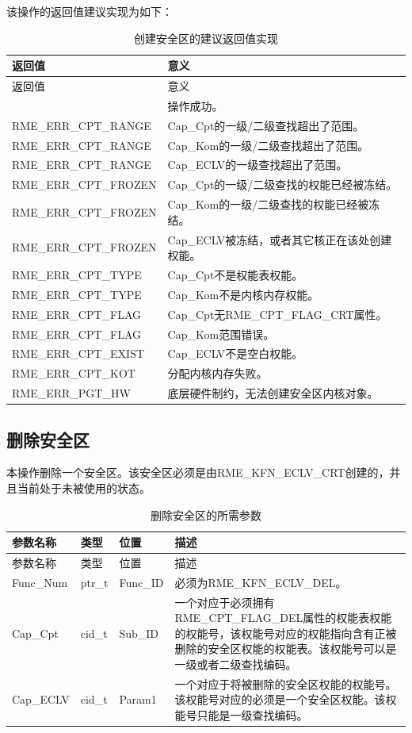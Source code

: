 该操作的返回值建议实现为如下：

\begin{xltabular}{\textwidth}{@{}>{\hsize\raggedright\arraybackslash}X>{\hsize\raggedright\arraybackslash}X@{}}
\caption{创建安全区的建议返回值实现}\label{tab:8-95-create-enclave-suggested-return-values}\\
\toprule
返回值 & 意义\tabularnewline
\endfirsthead
\toprule
返回值 & 意义\tabularnewline
\midrule
\endhead
\bottomrule
{} & 操作成功。\tabularnewline
    RME\_ERR\_CPT\_RANGE & Cap\_Cpt的一级/二级查找超出了范围。\tabularnewline
    RME\_ERR\_CPT\_RANGE & Cap\_Kom的一级/二级查找超出了范围。\tabularnewline
    RME\_ERR\_CPT\_RANGE & Cap\_ECLV的一级查找超出了范围。\tabularnewline
    RME\_ERR\_CPT\_FROZEN & Cap\_Cpt的一级/二级查找的权能已经被冻结。\tabularnewline
    RME\_ERR\_CPT\_FROZEN & Cap\_Kom的一级/二级查找的权能已经被冻结。\tabularnewline
    RME\_ERR\_CPT\_FROZEN & Cap\_ECLV被冻结，或者其它核正在该处创建权能。\tabularnewline
    RME\_ERR\_CPT\_TYPE & Cap\_Cpt不是权能表权能。\tabularnewline
    RME\_ERR\_CPT\_TYPE & Cap\_Kom不是内核内存权能。\tabularnewline
    RME\_ERR\_CPT\_FLAG & Cap\_Cpt无RME\_CPT\_FLAG\_CRT属性。\tabularnewline
    RME\_ERR\_CPT\_FLAG & Cap\_Kom范围错误。\tabularnewline
    RME\_ERR\_CPT\_EXIST & Cap\_ECLV不是空白权能。\tabularnewline
    RME\_ERR\_CPT\_KOT & 分配内核内存失败。\tabularnewline
    RME\_ERR\_PGT\_HW & 底层硬件制约，无法创建安全区内核对象。\tabularnewline
\end{xltabular}

\subsection{删除安全区}\label{subsec:8-delete-enclave}

本操作删除一个安全区。该安全区必须是由RME\_KFN\_ECLV\_CRT创建的，并且当前处于未被使用的状态。

\begin{xltabular}{\textwidth}{@{}>{\hsize\raggedright\arraybackslash}X>{\hsize\raggedright\arraybackslash}X>{\hsize\raggedright\arraybackslash}X>{\hsize\raggedright\arraybackslash}X@{}}
\caption{删除安全区的所需参数}\label{tab:8-96-delete-enclave-parameters}\\
\toprule
参数名称 & 类型 & 位置 & 描述\tabularnewline
\endfirsthead
\toprule
参数名称 & 类型 & 位置 & 描述\tabularnewline
\midrule
\endhead
\bottomrule
\endlastfoot
Func\_Num & ptr\_t & Func\_ID &
必须为RME\_KFN\_ECLV\_DEL。\tabularnewline
Cap\_Cpt & cid\_t & Sub\_ID &
一个对应于必须拥有RME\_CPT\_FLAG\_DEL属性的权能表权能的权能号，该权能号对应的权能指向含有正被删除的安全区权能的权能表。该权能号可以是一级或者二级查找编码。\tabularnewline
Cap\_ECLV & cid\_t & Param1 &
一个对应于将被删除的安全区权能的权能号。该权能号对应的必须是一个安全区权能。该权能号只能是一级查找编码。\tabularnewline
\end{xltabular}

